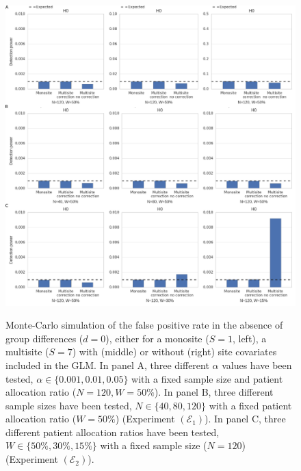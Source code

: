 \documentclass[authoryear]{elsarticle}
\begin{document}
\begin{figure}[htbp]
\centering
{\includegraphics[width=\textwidth]{../figures/h0_results.png}}

\caption{
Monte-Carlo simulation of the false positive rate in the absence of group differences ($d=0$), either for a monosite ($S=1$, left), a multisite ($S=7$) with (middle) or without (right) site covariates included in the GLM. In panel A, three different $\alpha$ values have been tested, $\alpha\in \{0.001, 0.01, 0.05\}$ with a fixed sample size and patient allocation ratio ($N=120,W=50\%$). In panel B, three different sample sizes have been tested, $N\in \{40, 80, 120\}$ with a fixed patient allocation ratio ($W=50\%$) (Experiment $(\mathcal{E}_1)$). In panel C, three different patient allocation ratios have been tested, $W\in \{50\%, 30\%, 15\%\}$ with a fixed sample size ($N=120$) (Experiment $(\mathcal{E}_2)$).}
\label{fig_h0}
\end{figure}
\end{document}
